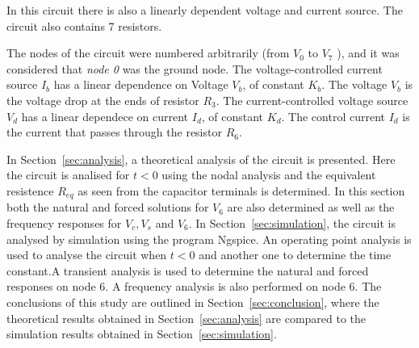 In this circuit there is also a linearly dependent voltage and current source. The circuit also contains 7 resistors.\par
The nodes of the circuit were numbered arbitrarily (from {\it$V_{0}$}  to {\it$V_{7}$} ), and it was considered that {\it node 0} was the ground node. The voltage-controlled current source {\it $I_b$} has a linear dependence on Voltage {\it $V_b$}, of constant {\it $K_b$}. The voltage {\it $V_b$} is the voltage drop at the ends of resistor {\it $R_3$}. The current-controlled voltage source {\it $V_d$} has a linear dependece on current {\it $I_d$}, of constant {\it $K_d$}. The control current {\it $I_d$} is the current that passes through the resistor {\it $R_6$}.
 

In Section~\ref{sec:analysis}, a theoretical analysis of the circuit is
presented. Here the circuit is analised for $t<0$ using the nodal analysis and the equivalent resistence $R_{eq}$ as seen from the capacitor terminals is determined. In this section both the natural and forced solutions for $V_6$ are also determined as well as the frequency responses for $V_c, V_s$ and $V_6 $. In Section~\ref{sec:simulation}, the circuit is analysed by
simulation using the program Ngspice. An operating point analysis is used to analyse the circuit when $t<0$ and another one to determine the time constant.A transient analysis is used to determine the natural and forced responses on node 6. A frequency analysis is also performed on node 6. The conclusions of this study are outlined in
Section~\ref{sec:conclusion}, where the theoretical results obtained in
Section~\ref{sec:analysis} are compared to the simulation results obtained in
Section~\ref{sec:simulation}.




